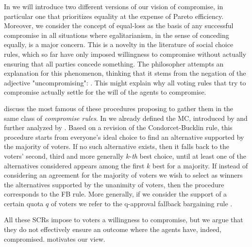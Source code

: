 In  we will introduce two different versions of our vision of compromise, in particular one that prioritizes equality at the expense of Pareto efficiency. Moreover, we consider the concept of equal-loss as the basis of any successful compromise in all situations where egalitarianism, in the sense of conceding equally, is a major concern.
This is a novelty in the literature of social choice rules, which so far have only imposed willingness to compromise without actually ensuring that all parties concede something.
The philosopher \citet{Day1989} attempts an explanation for this phenomenon, thinking that it stems from the negation of the adjective "uncompromising": 
\textit{}.
This might explain why all voting rules that try to compromise actually settle for the will of the agents to compromise. 

\cite{Merlin2019} discuss the most famous of these procedures proposing to gather them in the same class of \textit{compromise rules}.
In  we already defined the \acl{MC}, introduced by \citet{Sertel1986} and further analyzed by \citet{Sertel1999}. Based on a revision of the Condorcet-Bucklin rule, this procedure starts from everyone’s ideal choice to find an alternative supported by the majority of voters. If no such alternative exists, then it falls back to the voters’ second, third and more generally $k$-\emph{th} best choice, until at least one of the alternatives considered appears among the first $k$ best for a majority.
If instead of considering an agreement for the majority of voters we wish to select as winners the alternatives supported by the unanimity of voters, then the procedure corresponds to the \acl{FB} rule. 
More generally, if we consider the support of a certain quota $q$ of voters we refer to the q-approval fallback bargaining rule \citep{Brams2001}.

All these \acp{SCR} impose to voters a willingness to compromise, but we argue that they do not effectively ensure an outcome where the agents have, indeed, compromised.  motivates our view.

